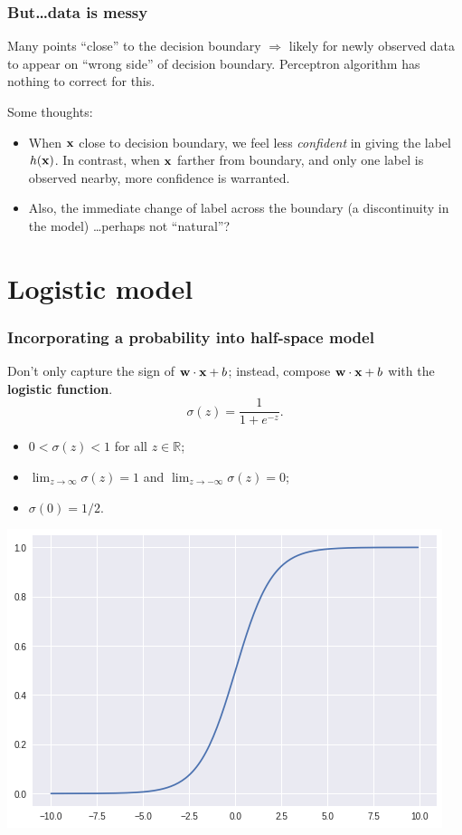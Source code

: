 \documentclass{beamer}
\theoremstyle{example}
\begin{document}
\begin{frame}
\frametitle{But\ldots data is messy}
\pause
Many points ``close'' to the decision boundary $\Rightarrow$ likely for newly observed data to appear on ``wrong side'' of decision boundary. Perceptron algorithm has nothing to correct for this.

\pause
Some thoughts:
\begin{itemize}
    \item When ${\bf x}$ close to decision boundary, we feel less \textit{confident} in giving the label $h({\bf x})$. In contrast, when ${\bf x}$ farther from boundary, and only one label is observed nearby, more confidence is warranted.
\pause
    \item Also, the immediate change of label across the boundary (a discontinuity in the model) \ldots perhaps not ``natural''?
\end{itemize}
\end{frame}

\section{Logistic model}

\begin{frame}
\frametitle{Incorporating a probability into half-space model}
Don't only capture the sign of ${\bf w}\cdot{\bf x} + b$; instead, compose ${\bf w}\cdot{\bf x} + b$ with the \textbf{logistic function}.    
    \[\sigma(z) = \frac{1}{1+e^{-z}}.\]

\pause
\begin{itemize}
    \item $0 < \sigma(z) < 1$ for all $z\in\mathbb R$;
    \pause
    \item $\lim_{z\to\infty}\sigma(z) = 1$ and $\lim_{z\to-\infty}\sigma(z) = 0$;
    \item $\sigma(0) = 1/2$.
\end{itemize}
\pause 

\centering
\includegraphics[height=0.3\textheight]{../../Images/logistic_function_graph.png}

\end{frame}
\end{document}
